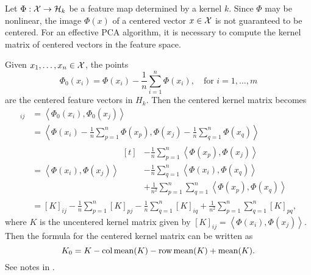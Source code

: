 
Let \(\Phi : \mathcal{X} \to \mathcal{H}_k\) be a feature map determined by a kernel \(k\).
Since \(\Phi\) may be nonlinear, the image \(\Phi(x)\) of a centered vector \(x \in \mathcal{X}\) is not guaranteed to be centered.
For an effective PCA algorithm, it is necessary to compute the kernel matrix of centered vectors in the feature space. \cite{scholkopf1998nonlinear}

Given \(x_1, \dots, x_n \in \mathcal{X}\), the points
\begin{equation}
    \label{eqn:centered-features}
    \Phi_0(x_i) = \Phi(x_i) - \frac{1}{n} \sum_{i=1}^{n} \Phi(x_i), \quad \text{for \(i = 1,\dots,m\)}
\end{equation}
are the centered feature vectors in \(H_k\).
Then the centered kernel matrix becomes
\def\ipt#1{\left\langle #1 \right\rangle}
\begin{align*}
    [K_0]_{ij}
    &= \ipt{\Phi_0(x_i), \Phi_0(x_j)}\\
    &= \ipt{\Phi(x_i) - \frac{1}{n} \sum_{p=1}^{n} \Phi(x_p), \Phi(x_j) - \frac{1}{n} \sum_{q=1}^{n} \Phi(x_q)}\\
    &= \ipt{\Phi(x_i), \Phi(x_j)}
    \begin{aligned}[t]
        &- \frac{1}{n} \sum_{p=1}^{n} \ipt{\Phi(x_p), \Phi(x_j)}\\
        &- \frac{1}{n} \sum_{q=1}^{n} \ipt{\Phi(x_i), \Phi(x_q)}\\
        &+ \frac{1}{n^2} \sum_{p=1}^{n} \sum_{q=1}^{n} \ipt{\Phi(x_p), \Phi(x_q)}
    \end{aligned}\\
    &= [K]_{ij} - \frac{1}{n} \sum_{p=1}^{n} [K]_{pj} - \frac{1}{n} \sum_{q=1}^{n} [K]_{iq} + \frac{1}{n^2} \sum_{p=1}^{n} \sum_{q=1}^{n} [K]_{pq},
\end{align*}
where \(K\) is the uncentered kernel matrix given by \([K]_{ij} = \ipt{\Phi(x_i), \Phi(x_j)}\).
Then the formula for the centered kernel matrix can be written as
\begin{equation}
    \label{eqn:centered-kernel-matrix}
    K_0 = K - \operatorname{col\,mean}(K) - \operatorname{row\,mean}(K) + \operatorname{mean}(K).
\end{equation}
See notes in .

